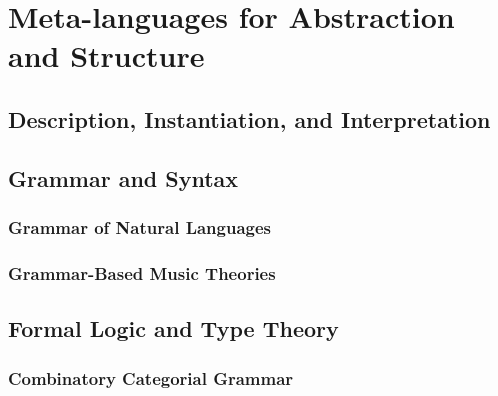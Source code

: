 \chapter{Meta-languages for Abstraction and Structure}
    \section{Description, Instantiation, and Interpretation} 
    \section{Grammar and Syntax}
        \subsection{Grammar of Natural Languages}
        \subsection{Grammar-Based Music Theories}
    \section{Formal Logic and Type Theory}
        \subsection{Combinatory Categorial Grammar}